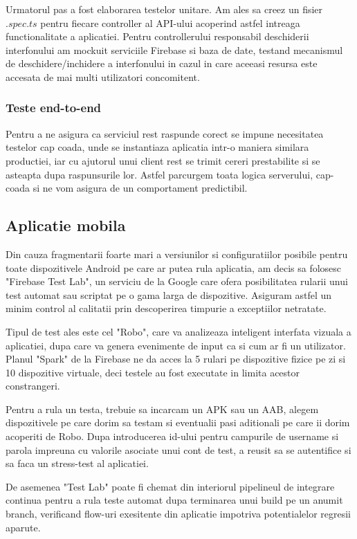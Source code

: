 Urmatorul pas a fost elaborarea testelor unitare. Am ales sa creez un fisier $.spec.ts$ pentru fiecare controller al API-ului acoperind astfel intreaga functionalitate a aplicatiei. Pentru controllerului responsabil deschiderii interfonului am mockuit serviciile Firebase si baza de date, testand mecanismul de deschidere/inchidere a interfonului in cazul in care aceeasi resursa este accesata de mai multi utilizatori concomitent.

\subsubsection {Teste end-to-end}

Pentru a ne asigura ca serviciul \acrshort{rest} raspunde corect se impune necesitatea testelor cap coada, unde se instantiaza aplicatia intr-o maniera similara productiei, iar cu ajutorul unui client rest se trimit cereri prestabilite si se asteapta dupa raspunsurile lor. Astfel parcurgem toata logica serverului, cap-coada si ne vom asigura de un comportament predictibil.

\subsection {Aplicatie mobila}

Din cauza fragmentarii foarte mari a versiunilor si configuratiilor posibile pentru toate dispozitivele Android pe care ar putea rula aplicatia, am decis sa folosesc "Firebase Test Lab", un serviciu de la Google care ofera posibilitatea rularii unui test automat sau scriptat pe o gama larga de dispozitive. 
Asiguram astfel un minim control al calitatii prin descoperirea timpurie a exceptiilor netratate.

Tipul de test ales este cel "Robo", care va analizeaza inteligent interfata vizuala a aplicatiei, dupa care va genera evenimente de input ca si cum ar fi un utilizator. Planul "Spark" de la Firebase ne da acces la 5 rulari pe dispozitive fizice pe zi si 10 dispozitive virtuale, deci testele au fost executate in limita acestor constrangeri. 

Pentru a rula un testa, trebuie sa incarcam un APK sau un AAB, alegem dispozitivele pe care dorim sa testam si eventualii pasi aditionali pe care ii dorim acoperiti de Robo. Dupa introducerea id-ului pentru campurile de username si parola impreuna cu valorile asociate unui cont de test, a reusit sa se autentifice si sa faca un stress-test al aplicatiei.


De asemenea "Test Lab" poate fi chemat din interiorul pipelineul de integrare continua pentru a rula teste automat dupa terminarea unui build pe un anumit branch, verificand flow-uri exesitente din aplicatie impotriva potentialelor regresii aparute.